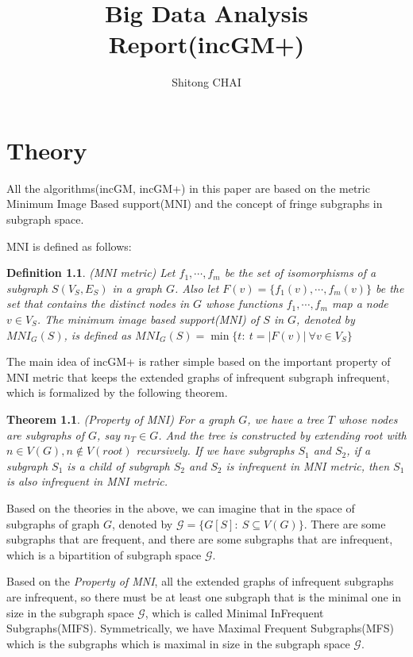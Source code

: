\documentclass[a4paper, 12pt]{report}
\title{Big Data Analysis Report(incGM+)}
\date{}
\author{Shitong CHAI}
\newtheorem{theorem}{Theorem}[chapter]
\newtheorem{definition}{Definition}[chapter]
\begin{document}
\maketitle
\tableofcontents

\chapter {Theory}
All the algorithms(incGM, incGM+) in this paper\cite{incGM} are based on the metric Minimum Image Based support(MNI)\cite{mni} and the concept of fringe subgraphs in subgraph space.

MNI is defined as follows:
\begin{definition}
    (MNI metric\cite{grami}) Let $f_1,\cdots,f_m$ be the set of isomorphisms of a subgraph $S(V_S,E_S)$ in a graph $G$. Also let $F(v)=\{f_1(v),\cdots,f_m(v)\}$ be the set that contains the distinct nodes in $G$ whose functions $f_1,\cdots,f_m$ map a node $v\in V_S$. The minimum image based support(MNI) of $S$ in $G$, denoted by $MNI_G(S)$, is defined as $MNI_G(S)=\min\{t:\ t=|F(v)|\ \forall v\in V_S\}$
\end{definition}

The main idea of incGM+ is rather simple based on the important property of MNI metric that keeps the extended graphs of infrequent subgraph infrequent, which is formalized by the following theorem.
\begin{theorem}
    (Property of MNI\cite{grami}) For a graph $G$, we have a tree $T$  whose nodes are subgraphs of $G$, say $n_T\in G$. And the tree is constructed by extending root with $n\in V(G), n\notin V(root)$ recursively. If we have subgraphs $S_1$ and $S_2$, if a subgraph $S_1$ is a child of subgraph $S_2$ and $S_2$ is infrequent in MNI metric, then $S_1$ is also infrequent in MNI metric.
\end{theorem}
Based on the theories in the above, we can imagine that in the space of subgraphs of graph $G$, denoted by $\mathscr{G}=\{G[S]:\ S\subseteq V(G)\}$. There are some subgraphs that are frequent, and there are some subgraphs that are infrequent, which is a bipartition of subgraph space $\mathscr{G}$. 

Based on the \emph{Property of MNI}, all the extended graphs of infrequent subgraphs are infrequent, so there must be at least one subgraph that is the minimal one in size in the subgraph space $\mathscr{G}$, which is called Minimal InFrequent Subgraphs(MIFS). Symmetrically, we have
Maximal Frequent Subgraphs(MFS) which is the subgraphs which is maximal in size in the subgraph space $\mathscr{G}$.
\end{document}
